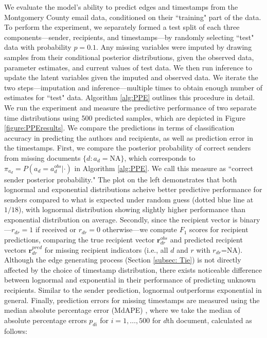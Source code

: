 \documentclass[ba]{imsart}
\numberwithin{equation}{section}
\theoremstyle{plain}
\begin{document}
	We evaluate the model's ability to predict edges and timestamps from the Montgomery County email data, conditioned on their ``training" part of the data. To perform the experiment, we separately formed a test split of each three components---sender, recipients, and timestamps---by randomly selecting ``test" data with probability $p=0.1$. Any missing variables were imputed by drawing samples from their conditional posterior distributions, given the observed data, parameter estimates, and current values of test data. We then run inference to update the latent variables given the imputed and observed data. We iterate the two steps---imputation and inference---multiple times to obtain enough number of estimates for ``test" data. Algorithm \ref{alg:PPE} outlines this procedure in detail. We run the experiment and measure the predictive performance of two separate time distributions using 500 predicted samples, which are depicted in Figure \ref{figure:PPEresults}. We compare the predictions in terms of classification accuracy in predicting the authors and recipients, as well as prediction error in the timestamps. First, we compare the posterior probability of correct senders from missing documents $\{d:a_d=\mbox{NA}\}$, which corresponds to $\pi_{a_{d}}=P(a_{d} = a^{obs}_{d}|\cdot)$ in Algorithm \ref{alg:PPE}. We call this measure as ``correct sender posterior probability." The plot on the left demonstrates that both lognormal and exponential distributions acheive better predictive performance for senders compared to what is expected under random guess (dotted blue line at $1/18$), with lognormal distribution showing slightly higher performance than exponential distribution on average. Secondly, since the recipient vector is binary---$r_{dr}=1$ if received or $r_{dr}=0$ otherwise---we compute $F_1$ scores for recipient predictions, comparing the true recipient vector $\boldsymbol{r}^{obs}_{dr}$ and predicted recipient vectors $\boldsymbol{r}^{pred}_{dr}$ for missing recipient indicators (i.e., all $d$ and $r$ with $r_{dr}$=NA). Although the edge generating process (Section \ref{subsec: Tie}) is not directly affected by the choice of timestamp distribution, there exists noticeable difference between lognormal and exponential in their performance of predicting unknown recipients. Similar to the sender prediction, lognormal outperforms exponential in general. Finally, prediction errors for missing timestamps are measured using the median absolute percentage error (MdAPE) \citep{hyndman2006another}, where we take the median of absolute percentage errors $p_{di}$ for $i=1,\ldots,500$ for $d$th document, calculated as follows:
\end{document}

